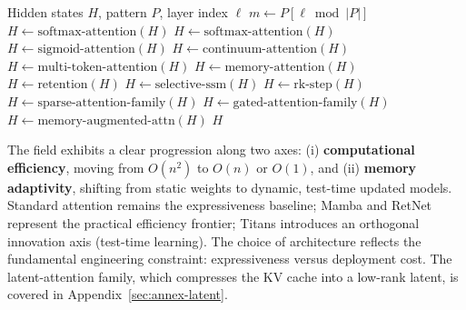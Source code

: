 \begin{algorithm}[t]
\caption{Pattern-Driven Mixer Forward (Conceptual)}
\begin{algorithmic}[1]
\Require Hidden states $H$, pattern $P$, layer index $\ell$
\State $m \gets P[\ell \bmod |P|]$
    \State $H \gets \text{softmax-attention}(H)$ 
    \State $H \gets \text{softmax-attention}(H)$
    \State $H \gets \text{sigmoid-attention}(H)$
    \State $H \gets \text{continuum-attention}(H)$ 
    \State $H \gets \text{multi-token-attention}(H)$ 
    \State $H \gets \text{memory-attention}(H)$
    \State $H \gets \text{retention}(H)$
    \State $H \gets \text{selective-ssm}(H)$
    \State $H \gets \text{rk-step}(H)$
    \State $H \gets \text{sparse-attention-family}(H)$
    \State $H \gets \text{gated-attention-family}(H)$
\Else
    \State $H \gets \text{memory-augmented-attn}(H)$
\EndIf
\State \Return $H$
\end{algorithmic}
\end{algorithm}

The field exhibits a clear progression along two axes: (i) \textbf{computational efficiency}, moving from $O(n^2)$ to $O(n)$ or $O(1)$, and (ii) \textbf{memory adaptivity}, shifting from static weights to dynamic, test-time updated models. Standard attention remains the expressiveness baseline; Mamba and RetNet represent the practical efficiency frontier; Titans introduces an orthogonal innovation axis (test-time learning). The choice of architecture reflects the fundamental engineering constraint: expressiveness versus deployment cost. The latent-attention family, which compresses the KV cache into a low-rank latent, is covered in Appendix~\ref{sec:annex-latent}.